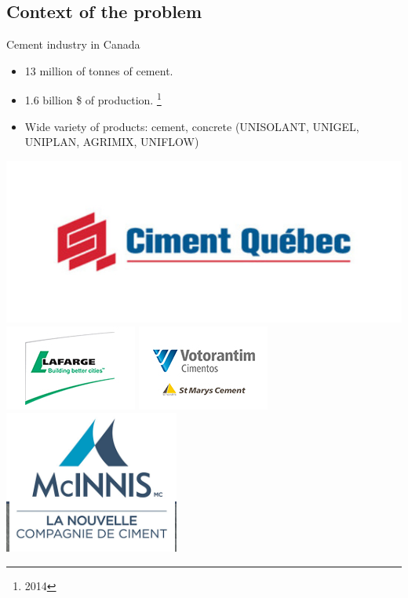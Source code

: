 \documentclass[9pt,xcolor={dvipsnames}]{beamer}
\begin{document}
\subsection{Context of the problem}
\begin{frame}{Cement  industry in Canada}
\begin{block}{ }
\begin{itemize}
\item 13 million of tonnes of cement. 
\item 1.6 billion \$ of production. \footnote{\label{1} 2014}
\item Wide variety of products:   cement, concrete (UNISOLANT, UNIGEL, UNIPLAN, AGRIMIX, UNIFLOW)


\end{itemize}
\vspace{0.1cm}
\begin{center}
	\includegraphics[scale=0.2]{ciment_quebec.jpg}
	\includegraphics[scale=0.2]{Lafarge-logo.jpg}
	\includegraphics[scale=0.2]{st-marys.jpg}
	\includegraphics[scale=0.2]{mc-innis.png}
\end{center}
\end{block}

\end{frame}
\end{document}
